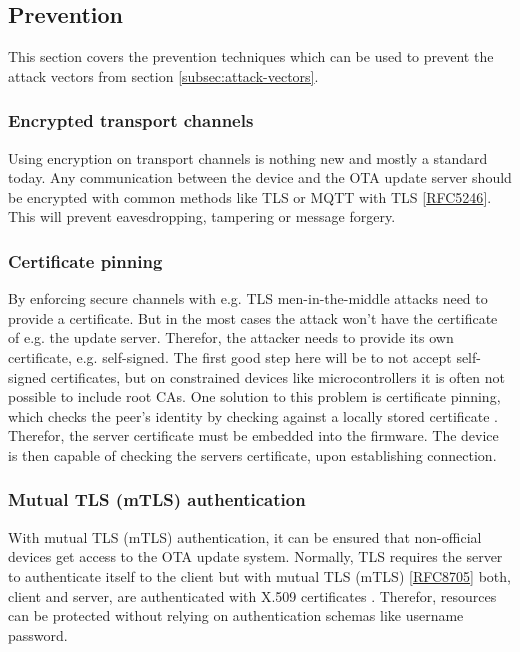 \subsection{Prevention}\label{subsec:prevention}
This section covers the prevention techniques which can be used to prevent the attack vectors from section \ref{subsec:attack-vectors}.

\subsubsection{Encrypted transport channels}\label{subsubsec:encrypted-transport-channels}
Using encryption on transport channels is nothing new and mostly a standard today. Any communication between the device and the OTA update server should be encrypted with common methods like TLS or MQTT with TLS [\href{https://datatracker.ietf.org/doc/html/rfc5246}{RFC5246}]. This will prevent eavesdropping, tampering or message forgery.

\subsubsection{Certificate pinning}\label{subsubsec:certificate-pinning}
By enforcing secure channels with e.g. TLS men-in-the-middle attacks need to provide a certificate. But in the most cases the attack won't have the certificate of e.g. the update server. Therefor, the attacker needs to provide its own certificate, e.g. self-signed. The first good step here will be to not accept self-signed certificates, but on constrained devices like microcontrollers it is often not possible to include root CAs. One solution to this problem is certificate pinning, which checks the peer's identity by checking against a locally stored certificate \cite{Walton2020}. Therefor, the server certificate must be embedded into the firmware. The device is then capable of checking the servers certificate, upon establishing connection.

\subsubsection{Mutual TLS (mTLS) authentication}\label{subsubsec:mutal-tls}
With mutual TLS (mTLS) authentication, it can be ensured that non-official devices get access to the OTA update system. Normally, TLS requires the server to authenticate itself to the client but with mutual TLS (mTLS) [\href{https://datatracker.ietf.org/doc/html/rfc8705}{RFC8705}] both, client and server, are authenticated with X.509 certificates \cite{Beswick2020}. Therefor, resources can be protected without relying on authentication schemas like username password.


